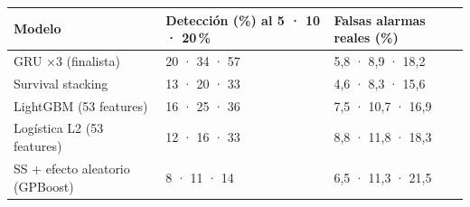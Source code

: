 \begin{tabular}{@{}lll@{}}
\toprule
Modelo & Detección (\%) al 5 · 10 · 20\,\% & Falsas alarmas reales (\%) \\
\midrule
GRU ×3 (finalista) & 20 · 34 · 57 & 5,8 · 8,9 · 18,2 \\
Survival stacking & 13 · 20 · 33 & 4,6 · 8,3 · 15,6 \\
LightGBM (53 features) & 16 · 25 · 36 & 7,5 · 10,7 · 16,9 \\
Logística L2 (53 features) & 12 · 16 · 33 & 8,8 · 11,8 · 18,3 \\
SS + efecto aleatorio (GPBoost) & 8 · 11 · 14 & 6,5 · 11,3 · 21,5 \\
\bottomrule
\end{tabular}
